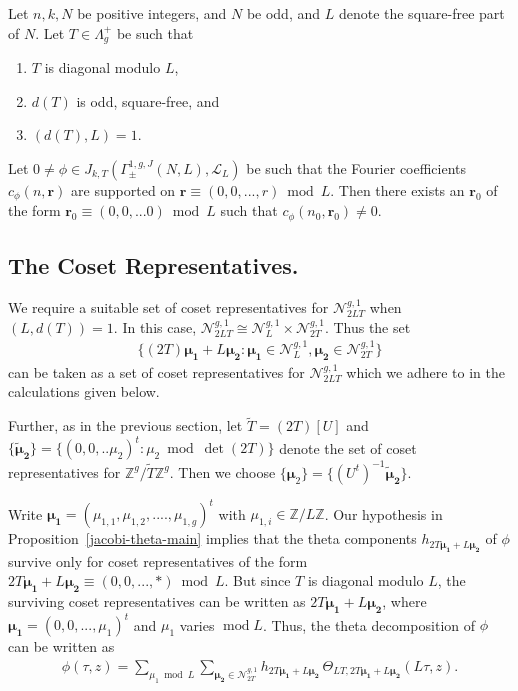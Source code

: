 \documentclass[11pt]{amsart}
\numberwithin{equation}{section}
\newcommand{\mbb}{\mathbb}
\newcommand{\mc}{\mathcal}
\newcommand{\mf}{\mathbf}
\renewcommand*{\mod}{\operatorname{mod}}
\begin{document}
\begin{proposition}\label{jacobi-theta-main}
     Let $n, k, N$ be positive integers, and $N$ be odd, and $L$ denote the square-free part of $N$. Let $T\in\Lambda_g^+$ be such that 
     \begin{enumerate}
     \item $T$ is diagonal modulo $L$, 
     \item  $d(T)$ is odd, square-free, and 
     \item $(d(T), L)=1$. 
     \end{enumerate}
     Let $0 \neq \phi\in J_{k, T}(\Gamma_\pm^{1,g, J}(N, L), \mc L_L)$ be such that the Fourier coefficients $c_{\phi}(n, \mf r)$ are supported on $\mf r\equiv (0,0,...,r)\bmod L$. Then there exists an $\mf r_0$ of the form $\mf r_0\equiv (0,0,...0)\bmod L$ such that $c_{\phi}(n_0, \mf r_0)\neq 0$.
\end{proposition}

\subsection{The Coset Representatives.} We require a suitable set of coset representatives for $\mc N_{2LT}^{g,1}$ when $(L, d(T))=1$. In this case, $\mc N_{2LT}^{g,1}\cong \mc N_{L}^{g,1}\times \mc N_{2T}^{g,1}$. Thus the set
\begin{align}\label{coset-reps}
  \{(2T)\bm{\mu_1}+L\bm{\mu_2}: \bm{\mu_1} \in  \mc N_{L}^{g,1}, \bm{\mu_2} \in \mc N_{2T}^{g,1} \}
\end{align}
can be taken as a set of coset representatives for $\mc N_{2LT}^{g,1}$ which we adhere to in the calculations given below.

Further, as in the previous section, let $\widetilde{T}=(2T)[U]$  and $\{\bm{\tilde\mu_2}\}=\{(0,0,..\mu_2)^t: \mu_2 \bmod \det(2T)\}$ denote the set of coset representatives for $\mbb Z^g/\widetilde{T}\mbb Z^g$. Then we choose $\{\bm \mu_2\}=\{(U^t)^{-1}\bm{\tilde\mu_2}\}$.

Write $\bm{\mu_1}=(\mu_{1,1}, \mu_{1,2},....,\mu_{1,g})^t$ with $\mu_{1,i}\in \mbb Z/L\mbb Z$. Our hypothesis in Proposition~\ref{jacobi-theta-main} implies that the theta components $h_{2T\bm{\mu_1}+L\bm{\mu_2}}$ of $\phi$ survive only for coset representatives of the form $ \displaystyle 2T\bm{\mu_1}+L\bm{\mu_2}\equiv (0,0,...,*)\bmod L$. But since $T$ is diagonal modulo $L$, the surviving coset representatives can be written as $2T\bm{\mu_1}+L\bm{\mu_2}$, where $\bm{\mu_1}=(0,0,...,\mu_1)^t$ and $\mu_1$ varies $\mod L$. Thus, the theta decomposition of $\phi$ can be written as 
     \begin{align}\label{phi-dec-4.1}
         \phi(\tau, z)=\sum_{\mu_1\bmod L}\sum_{\bm{\mu_2}\in\mc N_{2T}^{g,1}}h_{2T\bm{\mu_1}+L\bm{\mu_2}} \, \Theta_{LT, 2T\bm{\mu_1}+L\bm{\mu_2}}(L\tau, z).
     \end{align}  
\end{document}
